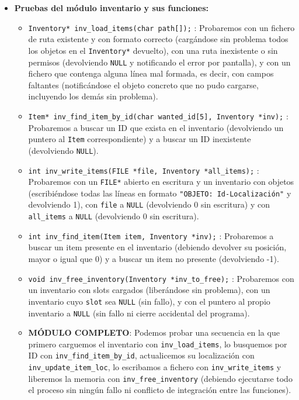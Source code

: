\begin{itemize}
		\item \textbf{Pruebas del módulo inventario y sus funciones:}
		\begin{itemize}
			\item \verb|Inventory* inv_load_items(char path[]);| : Probaremos con un fichero de ruta existente y con formato correcto 
			(cargándose sin problema todos los objetos en el \verb|Inventory*| devuelto), 
			con una ruta inexistente o sin permisos (devolviendo \verb|NULL| y notificando el error por pantalla), 
			y con un fichero que contenga alguna línea mal formada, es decir, con campos faltantes 
			(notificándose el objeto concreto que no pudo cargarse, incluyendo los demás sin problema).
			\item \verb|Item* inv_find_item_by_id(char wanted_id[5], Inventory *inv);| : Probaremos a buscar un ID que exista en el inventario 
			(devolviendo un puntero al \verb|Item| correspondiente) y a buscar un ID inexistente (devolviendo \verb|NULL|).
			\item \verb|int inv_write_items(FILE *file, Inventory *all_items);| : Probaremos con un \verb|FILE*| abierto en escritura 
			y un inventario con objetos (escribiéndose todas las líneas en formato \verb|"OBJETO: Id-Localización"| y devolviendo 1), 
			con \verb|file| a \verb|NULL| (devolviendo 0 sin escritura) y con \verb|all_items| a \verb|NULL| (devolviendo 0 sin escritura).
			\item \verb|int inv_find_item(Item item, Inventory *inv);| : Probaremos a buscar un item presente en 
			el inventario (debiendo devolver su posición, mayor o igual que 0) y a buscar un item no presente (devolviendo -1).
			\item \verb|void inv_free_inventory(Inventory *inv_to_free);| : Probaremos con un inventario con slots cargados 
			(liberándose sin problema), con un inventario cuyo \verb|slot| sea \verb|NULL| (sin fallo), y con el puntero al propio 
			inventario a \verb|NULL| (sin fallo ni cierre accidental del programa).
			\\ \item \textbf{MÓDULO COMPLETO}: Podemos probar una secuencia en la que primero carguemos el inventario 
			con \verb|inv_load_items|, lo busquemos por ID con \verb|inv_find_item_by_id|,
			 actualicemos su localización con \verb|inv_update_item_loc|, lo escribamos a fichero con \verb|inv_write_items| y liberemos la memoria con \verb|inv_free_inventory| 
			 (debiendo ejecutarse todo el proceso sin ningún fallo ni conflicto de integración entre las funciones).
		\end{itemize}


\end{itemize}
